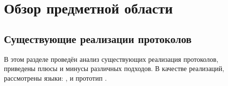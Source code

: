 \section{Обзор предметной области}





\subsection{Существующие реализации протоколов}
В этом разделе проведён анализ существующих реализация протоколов, приведены плюсы и минусы различных подходов. В качестве реализаций, рассмотрены языки: ,  и прототип .





